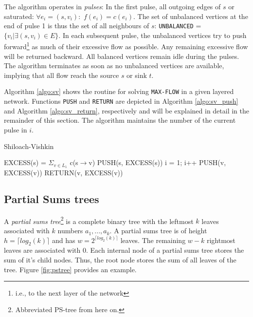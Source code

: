 \documentclass[a4paper,10pt, twocolumn]{article}
\begin{document}
The algorithm operates in \emph{pulses}: In the first pulse, all outgoing edges of $s$ or saturated: $\forall e_i = (s, v_i):$ $f(e_i) = c(e_i)$. The set of unbalanced vertices at the end of pulse 1 is thus the set of all neighbours of $s$: \lstinline|UNBALANCED| = $\{v_i\lvert \exists (s, v_i) \in E \}$. In each subsequent pulse, the unbalanced vertices try to push forward\footnote{i.e., to the next layer of the network} as much of their excessive flow as possible. Any remaining excessive flow will be returned backward. All balanced vertices remain idle during the pulses. The algorithm terminates as soon as no unbalanced vertices are available, implying that all flow reach the source $s$ or sink $t$.

Algorithm \ref{algo:sv} shows the routine for solving \lstinline|MAX-FLOW| in a given layered network. Functions \lstinline|PUSH| and \lstinline|RETURN| are depicted in Algorithm \ref{algo:sv_push} and Algorithm \ref{algo:sv_return}, respectively and will be explained in detail in the remainder of this section. The algorithm maintains the number of the current pulse in $i$.

\begin{algorithm}
\caption{Shiloach-Vishkin}
\label{algo:sv}
\begin{algorithmic}[1]
		\State EXCESS(s) = $\Sigma_{v \in L_1}$ c(s$\rightarrow$v)
		\State PUSH(s, EXCESS(s))
		i = 1;
			\State i++
					\State PUSH(v, EXCESS(v))
				\EndIf
			\EndFor
			\State RETURN(v, EXCESS(v))
		\EndWhile
	\EndFunction
\end{algorithmic}
\end{algorithm}

\subsection{Partial Sums trees}
\label{sec:sv_pstrees}
A \emph{partial sums tree}\footnote{Abbreviated PS-tree from here on.} is a complete binary tree with the leftmost $k$ leaves associated with $k$ numbers $a_1,...,a_k$. A partial sums tree is of height $h = \lceil log_2(k) \rceil$ and has $w = 2^{\lceil log_2(k) \rceil}$ leaves. The remaining $w - k$ rightmost leaves are associated with 0. Each internal node of a partial sums tree stores the sum of it's child nodes. Thus, the root node stores the sum of all leaves of the tree. Figure \ref{fig:pstree} provides an example.
\end{document}
